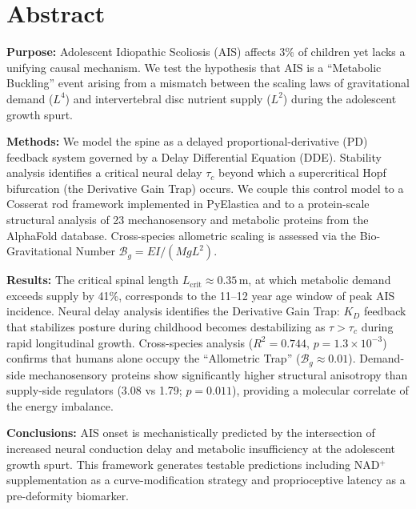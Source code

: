 \documentclass[11pt]{article}
\begin{document}
\linenumbers

\section*{Abstract}

\noindent\textbf{Purpose:} Adolescent Idiopathic Scoliosis (AIS) affects 3\% of children yet lacks a unifying causal mechanism. We test the hypothesis that AIS is a ``Metabolic Buckling'' event arising from a mismatch between the scaling laws of gravitational demand ($L^4$) and intervertebral disc nutrient supply ($L^2$) during the adolescent growth spurt.

\medskip
\noindent\textbf{Methods:} We model the spine as a delayed proportional-derivative (PD) feedback system governed by a Delay Differential Equation (DDE). Stability analysis identifies a critical neural delay $\tau_c$ beyond which a supercritical Hopf bifurcation (the Derivative Gain Trap) occurs. We couple this control model to a Cosserat rod framework implemented in PyElastica and to a protein-scale structural analysis of 23 mechanosensory and metabolic proteins from the AlphaFold database. Cross-species allometric scaling is assessed via the Bio-Gravitational Number $\mathcal{B}_g = EI/(MgL^2)$.

\medskip
\noindent\textbf{Results:} The critical spinal length $L_{\mathrm{crit}} \approx 0.35$\,m, at which metabolic demand exceeds supply by 41\%, corresponds to the 11--12 year age window of peak AIS incidence. Neural delay analysis identifies the Derivative Gain Trap: $K_D$ feedback that stabilizes posture during childhood becomes destabilizing as $\tau > \tau_c$ during rapid longitudinal growth. Cross-species analysis ($R^2 = 0.744$, $p = 1.3 \times 10^{-3}$) confirms that humans alone occupy the ``Allometric Trap'' ($\mathcal{B}_g \approx 0.01$). Demand-side mechanosensory proteins show significantly higher structural anisotropy than supply-side regulators (3.08 vs 1.79; $p = 0.011$), providing a molecular correlate of the energy imbalance.

\medskip
\noindent\textbf{Conclusions:} AIS onset is mechanistically predicted by the intersection of increased neural conduction delay and metabolic insufficiency at the adolescent growth spurt. This framework generates testable predictions including NAD$^+$ supplementation as a curve-modification strategy and proprioceptive latency as a pre-deformity biomarker.

\vspace{1em}
\end{document}
